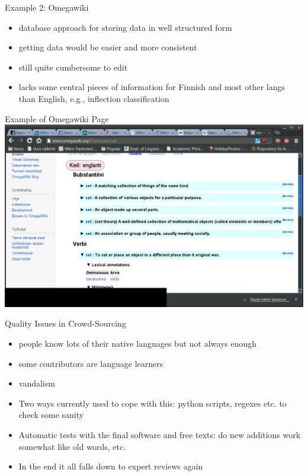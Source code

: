 \documentclass[t,12pt]{beamer}
\begin{document}
\begin{frame}{Example 2: Omegawiki}
    \begin{itemize}
        \item database approach for storing data in well structured form
        \item getting data would be easier and more consistent
        \item still quite cumbersome to edit
        \item lacks some central pieces of information for Finnish and most
            other langs than English, e.g., inflection classification
    \end{itemize}
\end{frame}

\begin{frame}[plain]{Example of Omegawiki Page}
    \includegraphics[keepaspectratio=true,width=1\paperwidth]{omegawiki}
\end{frame}

\begin{frame}{Quality Issues in Crowd-Sourcing}
    \begin{itemize}
        \item people know lots of their native languages but not always enough
        \item some contributors are language learners
        \item vandalism
        \item Two ways currently used to cope with this: python scripts, regexes
            etc. to check some sanity
        \item Automatic tests with the final software and free texts: do new
            additions work somewhat like old words, etc.
        \item In the end it all falls down to expert reviews again
    \end{itemize}
\end{frame}
\end{document}
